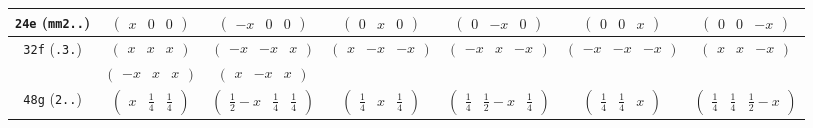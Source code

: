 \documentclass[fleqn,9pt,landscape]{jsarticle}
\begin{document}
\begin{center}
\begin{longtable}{ccccccc}
{\tt 24e} ({\tt mm2..}) & $ \begin{pmatrix} x & 0 & 0 \end{pmatrix} $ & $ \begin{pmatrix} - x & 0 & 0 \end{pmatrix} $ & $ \begin{pmatrix} 0 & x & 0 \end{pmatrix} $ & $ \begin{pmatrix} 0 & - x & 0 \end{pmatrix} $ & $ \begin{pmatrix} 0 & 0 & x \end{pmatrix} $ & $ \begin{pmatrix} 0 & 0 & - x \end{pmatrix} $ \\ \hline
{\tt 32f} ({\tt .3.}) & $ \begin{pmatrix} x & x & x \end{pmatrix} $ & $ \begin{pmatrix} - x & - x & x \end{pmatrix} $ & $ \begin{pmatrix} x & - x & - x \end{pmatrix} $ & $ \begin{pmatrix} - x & x & - x \end{pmatrix} $ & $ \begin{pmatrix} - x & - x & - x \end{pmatrix} $ & $ \begin{pmatrix} x & x & - x \end{pmatrix} $ \\
& $ \begin{pmatrix} - x & x & x \end{pmatrix} $ & $ \begin{pmatrix} x & - x & x \end{pmatrix} $ & $  $ & $  $ & $  $ & $  $ \\ \hline
{\tt 48g} ({\tt 2..}) & $ \begin{pmatrix} x & \frac{1}{4} & \frac{1}{4} \end{pmatrix} $ & $ \begin{pmatrix} \frac{1}{2} - x & \frac{1}{4} & \frac{1}{4} \end{pmatrix} $ & $ \begin{pmatrix} \frac{1}{4} & x & \frac{1}{4} \end{pmatrix} $ & $ \begin{pmatrix} \frac{1}{4} & \frac{1}{2} - x & \frac{1}{4} \end{pmatrix} $ & $ \begin{pmatrix} \frac{1}{4} & \frac{1}{4} & x \end{pmatrix} $ & $ \begin{pmatrix} \frac{1}{4} & \frac{1}{4} & \frac{1}{2} - x \end{pmatrix} $ \\

\end{longtable}
\end{center}
\end{document}
